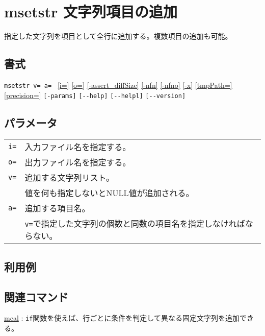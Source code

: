 
%

\section{msetstr 文字列項目の追加\label{sect:msetstr}}
指定した文字列を項目として全行に追加する。複数項目の追加も可能。

\subsection*{書式}
\verb|msetstr v= a= |
\hyperref[sect:option_i]{[i=]}
\hyperref[sect:option_o]{[o=]}
\hyperref[sect:option_assert_diffSize]{[-assert\_diffSize]}
\hyperref[sect:option_nfn]{[-nfn]} 
\hyperref[sect:option_nfno]{[-nfno]}  
\hyperref[sect:option_x]{[-x]}
\hyperref[sect:option_option_tmppath]{[tmpPath=]}
\hyperref[sect:option_precision]{[precision=]}
\verb|[-params]|
\verb|[--help]|
\verb|[--helpl]|
\verb|[--version]|\\

\subsection*{パラメータ}
\begin{table}[htbp]
{\small
\begin{tabular}{ll}
\verb|i=| & 入力ファイル名を指定する。\\
\verb|o=| & 出力ファイル名を指定する。\\ 
\verb|v=| & 追加する文字列リスト。\\
          & 値を何も指定しないとNULL値が追加される。\\
\verb|a=| & 追加する項目名。\\
          & \verb|v=|で指定した文字列の個数と同数の項目名を指定しなければならない。\\
\end{tabular}
}
\end{table}


\subsection*{利用例}

\subsection*{関連コマンド}
\hyperref[sect:mcal]{mcal} : \verb|if|関数を使えば、行ごとに条件を判定して異なる固定文字列を追加できる。

%

